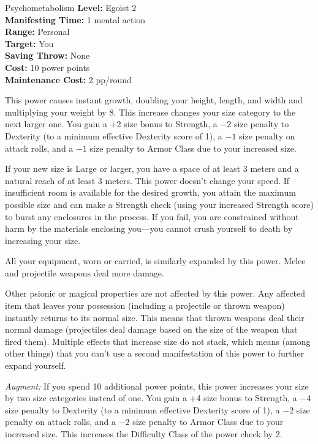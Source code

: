 {Psychometabolism}
{
	\textbf{Level:}
	Egoist 2\\
	\textbf{Manifesting Time:}
	1 mental action\\
	\textbf{Range:}
	Personal\\
	\textbf{Target:}
	You\\
	\textbf{Saving Throw:}
	None\\
	\textbf{Cost:}
	10 power points\\
	\textbf{Maintenance Cost:}
	2 pp/round\\
}
{
	This power causes instant growth, doubling your height, length, and width and multiplying your weight by 8. This increase changes your size category to the next larger one. You gain a +2 size bonus to Strength, a $-2$ size penalty to Dexterity (to a minimum effective Dexterity score of 1), a $-1$ size penalty on attack rolls, and a $-1$ size penalty to Armor Class due to your increased size.

	If your new size is Large or larger, you have a space of at least 3 meters and a natural reach of at least 3 meters. This power doesn't change your speed. If insufficient room is available for the desired growth, you attain the maximum possible size and can make a Strength check (using your increased Strength score) to burst any enclosures in the process. If you fail, you are constrained without harm by the materials enclosing you—you cannot crush yourself to death by increasing your size.

	All your equipment, worn or carried, is similarly expanded by this power. Melee and projectile weapons deal more damage.

	Other psionic or magical properties are not affected by this power. Any affected item that leaves your possession (including a projectile or thrown weapon) instantly returns to its normal size. This means that thrown weapons deal their normal damage (projectiles deal damage based on the size of the weapon that fired them). Multiple effects that increase size do not stack, which means (among other things) that you can't use a second manifestation of this power to further expand yourself.

	\textit{Augment:} If you spend 10 additional power points, this power increases your size by two size categories instead of one. You gain a +4 size bonus to Strength, a $-4$ size penalty to Dexterity (to a minimum effective Dexterity score of 1), a $-2$ size penalty on attack rolls, and a $-2$ size penalty to Armor Class due to your increased size. This increases the Difficulty Class of the power check by 2.
}